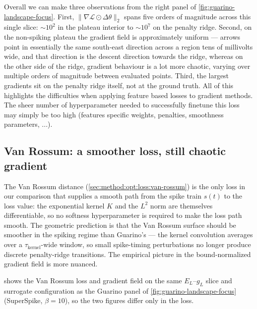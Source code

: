 Overall we can make three observations from the right panel of \cref{fig:guarino-landscape-focus}.
First, $\|\nabla\mathcal{L}\odot\Delta\theta\|_{2}$ spans five orders of magnitude across this single slice: $\sim 10^{2}$ in the plateau interior to $\sim 10^{7}$ on the penalty ridge.
Second, on the non-spiking plateau the gradient field is approximately uniform --- arrows point in essentially the same south-east direction across a region tens of millivolts wide, and that direction is the descent direction towards the ridge, whereas on the other side of the ridge, gradient behaviour is a lot more chaotic, varying over multiple orders of magnitude between evaluated points.
Third, the largest gradients sit on the penalty ridge itself, not at the ground truth.
All of this highlights the difficulties when applying feature based losses to gradient methods.
The sheer number of hyperparameter needed to successfully finetune this loss may simply be too high (features specific weights, penalties, smoothness parameters, ...).

\subsection{Van Rossum: a smoother loss, still chaotic gradient}\label{sec:results:landscape:vanrossum}

The Van Rossum distance (\cref{sec:method:opt:loss:van-rossum}) is the only loss in our comparison that supplies a smooth path from the spike train $s(t)$ to the loss value: the exponential kernel $K$ and the $L^{2}$ norm are themselves differentiable, so no softness hyperparameter is required to make the loss path smooth.
The geometric prediction is that the Van Rossum surface should be smoother in the spiking regime than Guarino's --- the kernel convolution averages over a $\tau_{\mathrm{kernel}}$-wide window, so small spike-timing perturbations no longer produce discrete penalty-ridge transitions.
The empirical picture in the bound-normalized gradient field is more nuanced.

 shows the Van Rossum loss and gradient field on the same $E_L$--$g_L$ slice and surrogate configuration as the Guarino panel of \cref{fig:guarino-landscape-focus} (SuperSpike, $\beta=10$), so the two figures differ only in the loss.

